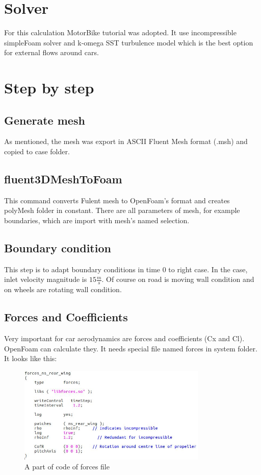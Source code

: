 \section{Solver}
For this calculation MotorBike tutorial was adopted. It use incompressible simpleFoam solver and k-omega SST turbulence model which is the best option for external flows around cars.

\section{Step by step}


\subsection{Generate mesh}
As mentioned, the mesh was export in ASCII Fluent Mesh format (.msh) and copied to case folder.


\subsection{fluent3DMeshToFoam}
This command converts Fulent mesh to OpenFoam's format and creates polyMesh folder in constant. There are all parameters of mesh, for example boundaries, which are import with mesh's named selection.


\subsection{Boundary condition}
This step is to adapt boundary conditions in time 0 to right case. In the case, inlet velocity magnitude is $15\frac{m}{s}$. Of course on road is moving wall condition and on wheels are rotating wall condition.


\subsection{Forces and Coefficients}
Very important for car aerodynamics are forces and coefficients (Cx and Cl). OpenFoam can calculate they. It needs special file named forces in system folder. It looks like this:
\begin{figure}[h!]
\begin{center}
\includegraphics[width=9cm]{img/forces}
\caption{A part of code of forces file}
\end{center}
\end{figure}


